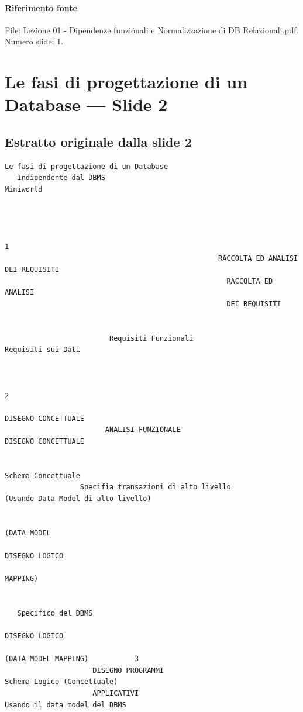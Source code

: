 \documentclass[11pt]{article}
\begin{document}
\paragraph{Riferimento fonte} File: Lezione 01 - Dipendenze funzionali e Normalizzazione di DB Relazionali.pdf. Numero slide: 1.
\section{Le fasi di progettazione di un Database --- Slide 2}
\subsection*{Estratto originale dalla slide 2}
\begin{lstlisting}
Le fasi di progettazione di un Database
   Indipendente dal DBMS                                      Miniworld



                                                                                                   1
                                                   RACCOLTA ED ANALISI DEI REQUISITI
                                                     RACCOLTA ED ANALISI
                                                     DEI REQUISITI


                         Requisiti Funzionali                                                   Requisiti sui Dati


                                                                                                                         2
                                                                                        DISEGNO CONCETTUALE
                        ANALISI FUNZIONALE                                                DISEGNO CONCETTUALE

                                                                                         Schema Concettuale
                  Specifia transazioni di alto livello                             (Usando Data Model di alto livello)

                                                                                       (DATA MODEL
                                                                                       DISEGNO LOGICO
                                                                                                   MAPPING)


   Specifico del DBMS
                                                                                             DISEGNO LOGICO
                                                                                          (DATA MODEL MAPPING)           3
                     DISEGNO PROGRAMMI                                                 Schema Logico (Concettuale)
                     APPLICATIVI                                                       Usando il data model del DBMS



\end{lstlisting}
\end{document}
